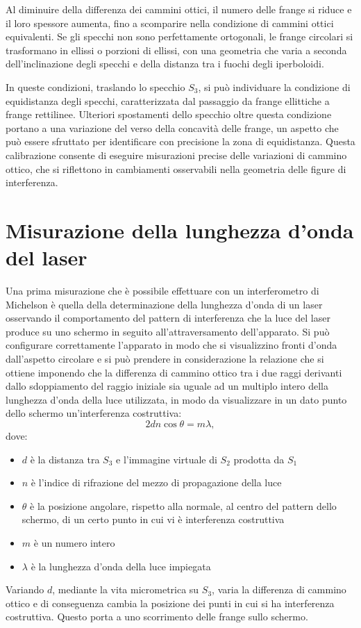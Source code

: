 \documentclass[a4paper,12pt]{article}
\begin{document}
Al diminuire della differenza dei cammini ottici, il numero delle frange si riduce e il loro spessore aumenta, fino a scomparire nella condizione di cammini ottici equivalenti. Se gli specchi non sono perfettamente ortogonali, le frange circolari si trasformano in ellissi o porzioni di ellissi, con una geometria che varia a seconda dell'inclinazione degli specchi e della distanza tra i fuochi degli iperboloidi. 

In queste condizioni, traslando lo specchio \(S_3\), si può individuare la condizione di equidistanza degli specchi, caratterizzata dal passaggio da frange ellittiche a frange rettilinee. Ulteriori spostamenti dello specchio oltre questa condizione portano a una variazione del verso della concavità delle frange, un aspetto che può essere sfruttato per identificare con precisione la zona di equidistanza. Questa calibrazione consente di eseguire misurazioni precise delle variazioni di cammino ottico, che si riflettono in cambiamenti osservabili nella geometria delle figure di interferenza.


\section{Misurazione della lunghezza d’onda del laser}
Una prima misurazione che è possibile effettuare con un interferometro di Michelson è quella della determinazione della lunghezza d’onda di un laser osservando il comportamento del pattern di interferenza che la luce del laser produce su uno schermo in seguito all’attraversamento dell’apparato. Si può configurare correttamente l’apparato in modo che si visualizzino fronti d’onda dall’aspetto circolare e si può prendere in considerazione la relazione che si ottiene imponendo che la differenza di cammino ottico tra i due raggi derivanti dallo sdoppiamento del raggio iniziale sia uguale ad un multiplo intero della lunghezza d’onda della luce utilizzata, in modo da visualizzare in un dato punto dello schermo un’interferenza costruttiva: 
\begin{equation}
2d n \cos\theta = m\lambda,
\label{eq:interferenza_costruttiva}
\end{equation}
dove:
\begin{itemize}
    \item \( d \) è la distanza tra \(S_3\) e l'immagine virtuale di \(S_2\) prodotta da \(S_1\)
    \item \( n \) è l’indice di rifrazione del mezzo di propagazione della luce
    \item \( \theta \) è la posizione angolare, rispetto alla normale, al centro del pattern dello schermo, di un certo punto in cui vi è interferenza costruttiva
    \item \( m \) è un numero intero
    \item \( \lambda \) è la lunghezza d’onda della luce impiegata
\end{itemize}
Variando \( d \), mediante la vita micrometrica su \( S_3\), varia la differenza di cammino ottico e di conseguenza cambia la posizione dei punti in cui si ha interferenza costruttiva. Questo porta a uno scorrimento delle frange sullo schermo.
\end{document}
